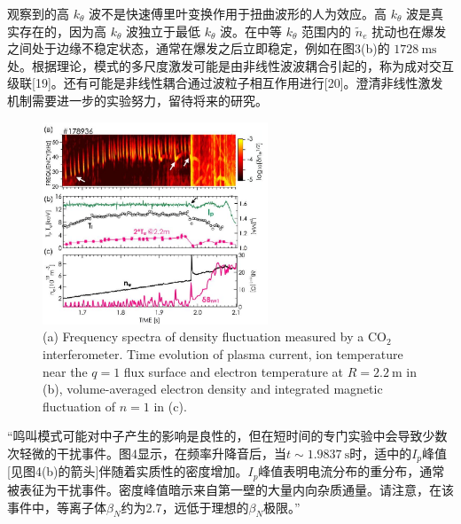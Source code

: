 \documentclass[oneside,onecolumn]{article}
\begin{document}
\begin{sloppypar}
  
 观察到的高 $k_{\theta}$ 波不是快速傅里叶变换作用于扭曲波形的人为效应。高 $k_{\theta}$ 波是真实存在的，因为高 $k_{\theta}$ 波独立于最低 $k_{\theta}$ 波。在中等 $k_{\theta}$ 范围内的 $\tilde{n}_e$ 扰动也在爆发之间处于边缘不稳定状态，通常在爆发之后立即稳定，例如在图3(b)的 $1728\mathrm{~ms}$ 处。根据理论，模式的多尺度激发可能是由非线性波波耦合引起的，称为成对交互级联[19]。还有可能是非线性耦合通过波粒子相互作用进行[20]。澄清非线性激发机制需要进一步的实验努力，留待将来的研究。
  \begin{figure}[htbp]
  	\centering
  	\includegraphics[max width=0.6\textwidth,max height=1.0\textheight]{2023_06_19_f8dbb752866ca158c73eg-3}
  	\caption{(a) Frequency spectra of density fluctuation measured by a $\mathrm{CO}_{2}$ interferometer. Time evolution of plasma current, ion temperature near the $q=1$ flux surface and electron temperature at $R=2.2 \mathrm{~m}$ in (b), volume-averaged electron density and integrated magnetic fluctuation of $n=1$ in (c).}
  	\label{figure4}
  \end{figure}
  
  
 “鸣叫模式可能对中子产生的影响是良性的，但在短时间的专门实验中会导致少数次轻微的干扰事件。图4显示，在频率升降音后，当$t\sim 1.9837 \mathrm{~s}$时，适中的$I_p$峰值[见图4(b)的箭头]伴随着实质性的密度增加。$I_p$峰值表明电流分布的重分布，通常被表征为干扰事件。密度峰值暗示来自第一壁的大量内向杂质通量。请注意，在该事件中，等离子体$\beta_N$约为2.7，远低于理想的$\beta_N$极限。”
  

\end{sloppypar}
\end{document}
